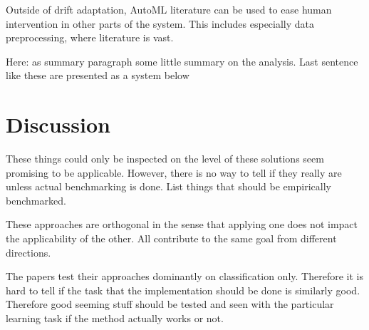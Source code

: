 Outside of drift adaptation, AutoML literature can be used to ease human intervention in other parts of the system. This includes especially data preprocessing, where literature is vast.





Here: as summary paragraph some little summary on the analysis. Last sentence like these are presented as a system below

\section{Discussion}

These things could only be inspected on the level of these solutions seem promising to be applicable. However, there is no way to tell if they really are unless actual benchmarking is done. List things that should be empirically benchmarked.

These approaches are orthogonal in the sense that applying one does not impact the applicability of the other. All contribute to the same goal from different directions.

The papers test their approaches dominantly on classification only. Therefore it is hard to tell if the task that the implementation should be done is similarly good. Therefore good seeming stuff should be tested and seen with the particular learning task if the method actually works or not.

